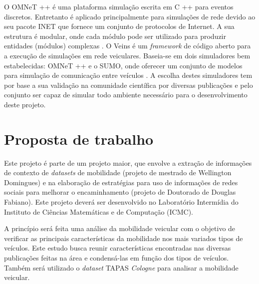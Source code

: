 \documentclass[mestrado, pre-defesa, english, brazil]{packages/icmc}
\begin{document}
O OMNeT ++ é uma plataforma simulação escrita em C ++ para eventos discretos. Entretanto é aplicado principalmente para simulações de rede devido ao seu pacote INET que fornece um conjunto de protocolos de Internet. A sua estrutura é modular, onde cada módulo pode ser utilizado para produzir entidades (módulos) complexas \cite{OMNeT++-2014}. O Veins é um \textit{framework} de código aberto para a execução de simulações em rede veiculares. Baseia-se em dois simuladores bem estabelecidas: OMNeT ++ e o SUMO, onde oferecer um conjunto de modelos para simulação de comunicação entre veículos \cite{Veins-2014}. A escolha destes simuladores tem por base a sua validação na comunidade científica por diversas publicações e pelo conjunto ser capaz de simular todo ambiente necessário para o desenvolvimento deste projeto.


\section{Proposta de trabalho}

Este projeto é parte de um projeto maior, que envolve a extração de informações de contexto de \textit{datasets} de mobilidade (projeto de mestrado de Wellington Domingues) e na elaboração de estratégias para uso de informações de redes sociais para melhorar o encaminhamento (projeto de Doutorado de Douglas Fabiano). Este projeto deverá ser desenvolvido no Laboratório Intermídia do Instituto de Ciências Matemáticas e de Computação (ICMC).

A princípio será feita uma análise da mobilidade veicular com o objetivo de verificar as principais características da mobilidade nos mais variados tipos de veículos. Este estudo busca reunir características encontradas nas diversas publicações feitas na área e condensá-las em função dos tipos de veículos. Também será utilizado o \textit{dataset} TAPAS \textit{Cologne} para analisar a mobilidade veicular.
\end{document}
